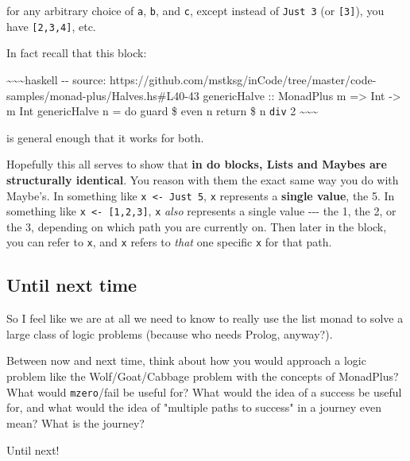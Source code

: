 \documentclass[]{article}
\begin{document}
for any arbitrary choice of \texttt{a}, \texttt{b}, and \texttt{c}, except
instead of \texttt{Just\ 3} (or \texttt{{[}3{]}}), you have
\texttt{{[}2,3,4{]}}, etc.

In fact recall that this block:

\textasciitilde{}\textasciitilde{}\textasciitilde{}haskell -\/- source:
https://github.com/mstksg/inCode/tree/master/code-samples/monad-plus/Halves.hs\#L40-43
genericHalve :: MonadPlus m =\textgreater{} Int -\textgreater{} m Int
genericHalve n = do guard \$ even n return \$ n \texttt{div} 2
\textasciitilde{}\textasciitilde{}\textasciitilde{}

is general enough that it works for both.

Hopefully this all serves to show that \textbf{in do blocks, Lists and Maybes
are structurally identical}. You reason with them the exact same way you do with
Maybe's. In something like \texttt{x\ \textless{}-\ Just\ 5}, \texttt{x}
represents a \textbf{single value}, the 5. In something like
\texttt{x\ \textless{}-\ {[}1,2,3{]}}, \texttt{x} \emph{also} represents a
single value -\/-\/- the 1, the 2, or the 3, depending on which path you are
currently on. Then later in the block, you can refer to \texttt{x}, and
\texttt{x} refers to \emph{that} one specific \texttt{x} for that path.

\subsection{Until next time}

So I feel like we are at all we need to know to really use the list monad to
solve a large class of logic problems (because who needs Prolog, anyway?).

Between now and next time, think about how you would approach a logic problem
like the Wolf/Goat/Cabbage problem with the concepts of MonadPlus? What would
\texttt{mzero}/fail be useful for? What would the idea of a success be useful
for, and what would the idea of "multiple paths to success" in a journey even
mean? What is the journey?

Until next!
\end{document}
